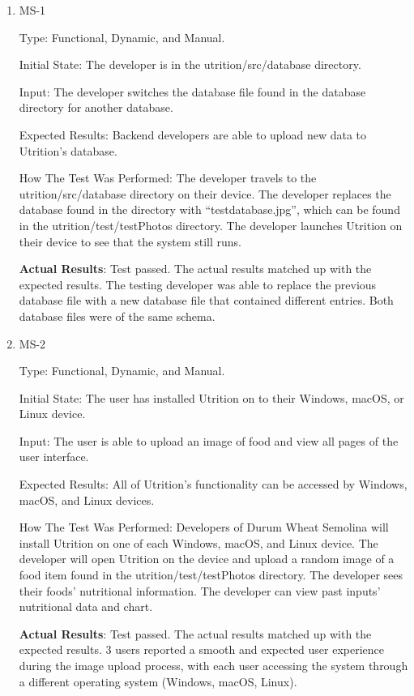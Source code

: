 \documentclass[12pt, titlepage]{article}
\begin{document}
	\begin{enumerate}
		
		\item{MS-1} 
		
		Type: Functional, Dynamic, and Manual.
		
		Initial State: The developer is in the utrition/src/database directory.
		
		Input: The developer switches the database file found in the database directory for another database.
		
		Expected Results: Backend developers are able to upload new data to Utrition’s database.
		
		How The Test Was Performed: The developer travels to the utrition/src/database directory on their device. The developer replaces the database found in the directory with “testdatabase.jpg”, which can be found in the utrition/test/testPhotos directory. The developer launches Utrition on their device to see that the system still runs.	
		
		\textbf{Actual Results}: Test passed. The actual results matched up with the expected results. The testing developer was able to replace the previous database file with a new database file that contained different entries. Both database files were of the same schema.
		
		\item{MS-2} 
		
		Type: Functional, Dynamic, and Manual.
		
		Initial State: The user has installed Utrition on to their Windows, macOS, or Linux device.
		
		Input: The user is able to upload an image of food and view all pages of the user interface.
		
		Expected Results: All of Utrition’s functionality can be accessed by Windows, macOS, and Linux devices.
		
		How The Test Was Performed: Developers of Durum Wheat Semolina will install Utrition on one of each Windows, macOS, and Linux device. The developer will open Utrition on the device and upload a random image of a food item found in the utrition/test/testPhotos directory. The developer sees their foods’ nutritional information. The developer can view past inputs' nutritional data and chart.
		
		\textbf{Actual Results}: Test passed. The actual results matched up with the expected results. 3 users reported a smooth and expected user experience during the image upload process, with each user accessing the system through a different operating system (Windows, macOS, Linux).
		
	\end{enumerate}
	
\end{document}
